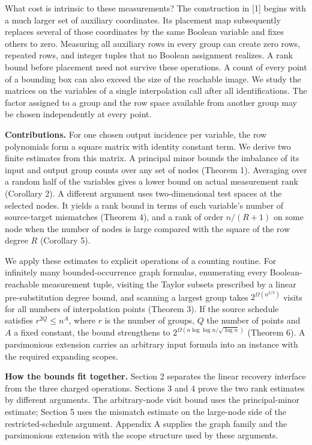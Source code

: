 \documentclass[
  10pt,
]{article}
\begin{document}
What cost is intrinsic to these measurements? The construction in
{[}1{]} begins with a much larger set of auxiliary coordinates. Its
placement map subsequently replaces several of those coordinates by the
same Boolean variable and fixes others to zero. Measuring all auxiliary
rows in every group can create zero rows, repeated rows, and integer
tuples that no Boolean assignment realizes. A rank bound before
placement need not survive these operations. A count of every point of a
bounding box can also exceed the size of the reachable image. We study
the matrices on the variables of a single interpolation call after all
identifications. The factor assigned to a group and the row space
available from another group may be chosen independently at every point.

\textbf{Contributions.} For one chosen output incidence per variable,
the row polynomials form a square matrix with identity constant term. We
derive two finite estimates from this matrix. A principal minor bounds
the imbalance of its input and output group counts over any set of nodes
(Theorem 1). Averaging over a random half of the variables gives a lower
bound on actual measurement rank (Corollary 2). A different argument
uses two-dimensional test spaces at the selected nodes. It yields a rank
bound in terms of each variable's number of source-target mismatches
(Theorem 4), and a rank of order \(n/(R+1)\) on some node when the
number of nodes is large compared with the square of the row degree
\(R\) (Corollary 5).

We apply these estimates to explicit operations of a counting routine.
For infinitely many bounded-occurrence graph formulas, enumerating every
Boolean-reachable measurement tuple, visiting the Taylor subsets
prescribed by a linear pre-substitution degree bound, and scanning a
largest group takes \(2^{\Omega(n^{2/3})}\) visits for all numbers of
interpolation points (Theorem 3). If the source schedule satisfies
\(r^{2Q}\le n^A\), where \(r\) is the number of groups, \(Q\) the number
of points and \(A\) a fixed constant, the bound strengthens to
\(2^{\Omega(n\log\log n/\sqrt{\log n})}\) (Theorem 6). A parsimonious
extension carries an arbitrary input formula into an instance with the
required expanding scopes.

\textbf{How the bounds fit together.} Section 2 separates the linear
recovery interface from the three charged operations. Sections 3 and 4
prove the two rank estimates by different arguments. The arbitrary-node
visit bound uses the principal-minor estimate; Section 5 uses the
mismatch estimate on the large-node side of the restricted-schedule
argument. Appendix A supplies the graph family and the parsimonious
extension with the scope structure used by these arguments.
\end{document}
